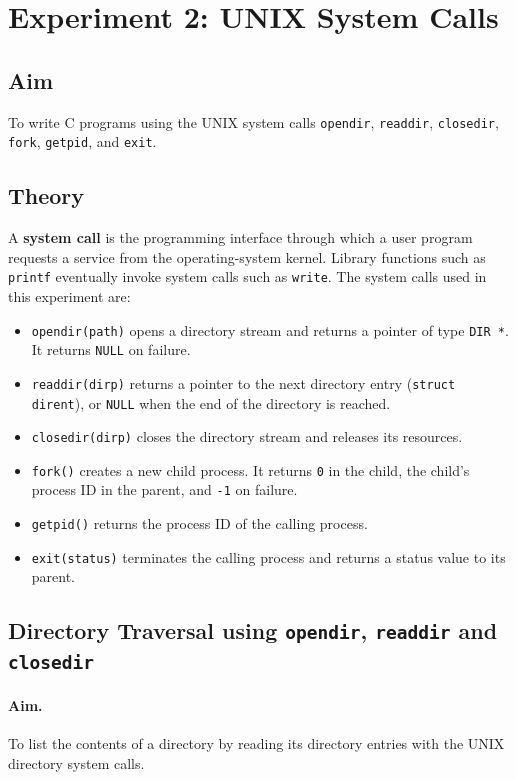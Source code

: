 \section{Experiment 2: UNIX System Calls}
\label{exp:syscalls}

\subsection*{Aim}
To write C programs using the UNIX system calls \texttt{opendir}, \texttt{readdir}, \texttt{closedir}, \texttt{fork}, \texttt{getpid}, and \texttt{exit}.

\subsection*{Theory}
A \textbf{system call} is the programming interface through which a user program requests a service from the operating-system kernel. Library functions such as \texttt{printf} eventually invoke system calls such as \texttt{write}. The system calls used in this experiment are:

\begin{itemize}
    \item \texttt{opendir(path)} opens a directory stream and returns a pointer of type \texttt{DIR *}. It returns \texttt{NULL} on failure.
    \item \texttt{readdir(dirp)} returns a pointer to the next directory entry (\texttt{struct dirent}), or \texttt{NULL} when the end of the directory is reached.
    \item \texttt{closedir(dirp)} closes the directory stream and releases its resources.
    \item \texttt{fork()} creates a new child process. It returns \texttt{0} in the child, the child's process ID in the parent, and \texttt{-1} on failure.
    \item \texttt{getpid()} returns the process ID of the calling process.
    \item \texttt{exit(status)} terminates the calling process and returns a status value to its parent.
\end{itemize}

\subsection{Directory Traversal using \texttt{opendir}, \texttt{readdir} and \texttt{closedir}}

\paragraph{Aim.}
To list the contents of a directory by reading its directory entries with the UNIX directory system calls.

